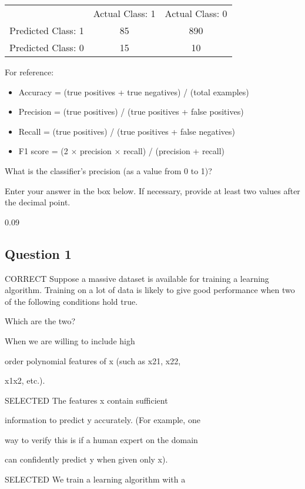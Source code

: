 \documentclass[11pt]{article} %
\begin{document}
\begin{tabular}{ccc}
& Actual Class: 1	& Actual Class: 0 \\
Predicted Class: 1 &	85&	890 \\ 
Predicted Class: 0 &	15&	10\\
\end{tabular} 

\begin{framed}
For reference:

\begin{itemize}
	\item Accuracy = (true positives + true negatives) / (total examples)
	\item Precision = (true positives) / (true positives + false positives)
	\item Recall = (true positives) / (true positives + false negatives)
	\item F1 score = (2 $\times$ precision $\times$ recall) / (precision + recall)
\end{itemize}

\end{framed}
What is the classifier's precision (as a value from 0 to 1)?

Enter your answer in the box below. If necessary, provide at least two values after the decimal point.

0.09
\subsection{Question 1} 
CORRECT
Suppose a massive dataset is available for training a learning algorithm. Training on a lot of data is likely to give good performance when two of the following conditions hold true.

Which are the two?


When we are willing to include high

order polynomial features of x (such as x21, x22,

x1x2, etc.).

SELECTED The features x contain sufficient

information to predict y accurately. (For example, one

way to verify this is if a human expert on the domain

can confidently predict y when given only x).


SELECTED  We train a learning algorithm with a
\end{document}

